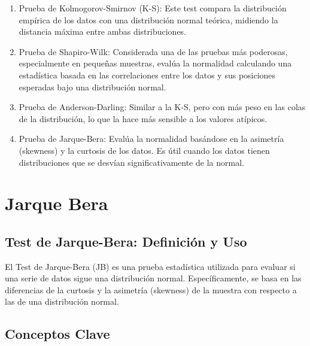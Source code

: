 \documentclass[
  us-letterpaper,
]{scrreprt}
\theoremstyle{plain}
\theoremstyle{plain}
\theoremstyle{definition}
\theoremstyle{remark}
\begin{document}
\begin{enumerate}
\def\labelenumi{\arabic{enumi}.}
\item
  Prueba de Kolmogorov-Smirnov (K-S): Este test compara la distribución
  empírica de los datos con una distribución normal teórica, midiendo la
  distancia máxima entre ambas distribuciones.
\item
  Prueba de Shapiro-Wilk: Considerada una de las pruebas más poderosas,
  especialmente en pequeñas muestras, evalúa la normalidad calculando
  una estadística basada en las correlaciones entre los datos y sus
  posiciones esperadas bajo una distribución normal.
\item
  Prueba de Anderson-Darling: Similar a la K-S, pero con más peso en las
  colas de la distribución, lo que la hace más sensible a los valores
  atípicos.
\item
  Prueba de Jarque-Bera: Evalúa la normalidad basándose en la asimetría
  (skewness) y la curtosis de los datos. Es útil cuando los datos tienen
  distribuciones que se desvían significativamente de la normal.
\end{enumerate}

\section{Jarque Bera}\label{sec-J_B}

\subsection{Test de Jarque-Bera: Definición y
Uso}\label{test-de-jarque-bera-definiciuxf3n-y-uso}

El Test de Jarque-Bera (JB) es una prueba estadística utilizada para
evaluar si una serie de datos sigue una distribución normal.
Específicamente, se basa en las diferencias de la curtosis y la
asimetría (skewness) de la muestra con respecto a las de una
distribución normal.

\subsection{Conceptos Clave}\label{conceptos-clave}
\end{document}
